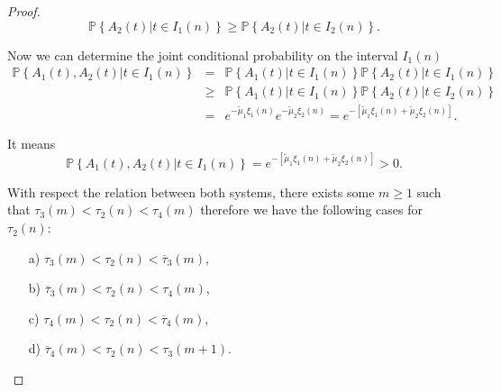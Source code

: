 \documentclass{article}
\newcommand{\prob}{\mathbb{P}}
\begin{document}
\begin{proof}
\begin{equation}
\prob\left\{A_{2}\left(t\right)|t\in I_{1}\left(n\right)\right\}\geq
\prob\left\{A_{2}\left(t\right)|t\in I_{2}\left(n\right)\right\}.
\end{equation}

Now we can determine the joint conditional probability on the interval $I_{1}\left(n\right)$
\begin{eqnarray*}
\prob\left\{A_{1}\left(t\right),A_{2}\left(t\right)|t\in I_{1}\left(n\right)\right\}&=&
\prob\left\{A_{1}\left(t\right)|t\in I_{1}\left(n\right)\right\}
\prob\left\{A_{2}\left(t\right)|t\in I_{1}\left(n\right)\right\}\\
&\geq&
\prob\left\{A_{1}\left(t\right)|t\in I_{1}\left(n\right)\right\}
\prob\left\{A_{2}\left(t\right)|t\in I_{2}\left(n\right)\right\}\\
&=&e^{-\tilde{\mu}_{1}\xi_{1}\left(n\right)}e^{-\tilde{\mu}_{2}\xi_{2}\left(n\right)}
=e^{-\left[\tilde{\mu}_{1}\xi_{1}\left(n\right)+\tilde{\mu}_{2}\xi_{2}\left(n\right)\right]}.
\end{eqnarray*}

It means 
\begin{equation}
\prob\left\{A_{1}\left(t\right),A_{2}\left(t\right)|t\in I_{1}\left(n\right)\right\}
=e^{-\left[\tilde{\mu}_{1}\xi_{1}\left(n\right)+\tilde{\mu}_{2}\xi_{2}
\left(n\right)\right]}>0.
\end{equation}

With respect the relation between both systems, there exists some $m\geq1$ such that $\tau_{3}\left(m\right)<\tau_{2}\left(n\right)<\tau_{4}\left(m\right)$ therefore we have the following cases for $\tau_{2}\left(n\right)$:

\begin{multicols}{2}
\begin{itemize}
\item[a)] $\tau_{3}\left(m\right)<\tau_{2}\left(n\right)<\overline{\tau}_{3}\left(m\right)$,

\item[b)] $\overline{\tau}_{3}\left(m\right)<\tau_{2}\left(n\right)
<\tau_{4}\left(m\right)$,

\item[c)] $\tau_{4}\left(m\right)<\tau_{2}\left(n\right)<
\overline{\tau}_{4}\left(m\right)$,

\item[d)] $\overline{\tau}_{4}\left(m\right)<\tau_{2}\left(n\right)
<\tau_{3}\left(m+1\right)$.
\end{itemize}
\end{multicols}


\end{proof}
\end{document}
